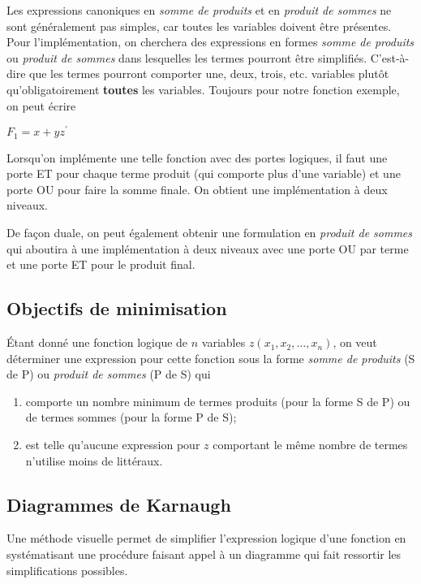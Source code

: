 \documentclass[11pt]{article}
\begin{document}
Les expressions canoniques en \emph{somme de produits} et en \emph{produit de
sommes} ne sont généralement pas simples, car toutes les variables
doivent être présentes. Pour l'implémentation, on cherchera des
expressions en formes \emph{somme de produits} ou \emph{produit de sommes} dans
lesquelles les termes pourront être simplifiés. C'est-à-dire que les
termes pourront comporter une, deux, trois, etc. variables plutôt
qu'obligatoirement \textbf{toutes} les variables. Toujours pour notre
fonction exemple, on peut écrire

\(F_1 = x + y z^\prime\)

Lorsqu'on implémente une telle fonction avec des portes logiques, il
faut une porte ET pour chaque terme produit (qui comporte plus d'une
variable) et une porte OU pour faire la somme finale. On obtient une
implémentation à deux niveaux.

De façon duale, on peut également obtenir une formulation en \emph{produit
de sommes} qui aboutira à une implémentation à deux niveaux avec une
porte OU par terme et une porte ET pour le produit final.


\subsection{Objectifs de minimisation}
\label{sec:orgac09167}

Étant donné une fonction logique de \(n\) variables \(z(x_1, x_2, \ldots,
x_n)\), on veut déterminer une expression pour cette fonction sous la
forme \emph{somme de produits} (S de P) ou \emph{produit de sommes} (P de S) qui

\begin{enumerate}
\item comporte un nombre minimum de termes produits (pour la forme S de P)
ou de termes sommes (pour la forme P de S);

\item est telle qu'aucune expression pour \(z\) comportant le même nombre
de termes n'utilise moins de littéraux.
\end{enumerate}

\subsection{Diagrammes de Karnaugh}
\label{sec:org8a89af5}

Une méthode visuelle permet de simplifier l'expression logique d'une
fonction en systématisant une procédure faisant appel à un diagramme
qui fait ressortir les simplifications possibles.
\end{document}
